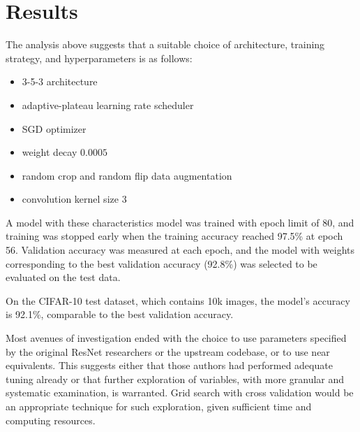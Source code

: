 \documentclass[letterpaper]{article} %
\begin{document}
\section{Results}

The analysis above suggests that a suitable choice of architecture, training strategy, and hyperparameters
is as follows:
\begin{itemize}
    \item 3-5-3 architecture
    \item adaptive-plateau learning rate scheduler
    \item SGD optimizer
    \item weight decay $ 0.0005 $
    \item random crop and random flip data augmentation
    \item convolution kernel size $ 3 $
\end{itemize}

A model with these characteristics model was trained with epoch limit of 80, and
training was stopped early when the training accuracy reached 97.5\% at epoch 56.
Validation accuracy was measured at each epoch, and the model with weights corresponding to the best
validation accuracy (92.8\%) was selected to be evaluated on the test data.

On the CIFAR-10 test dataset, which contains 10k images, the model's accuracy is 92.1\%,
comparable to the best validation accuracy.

Most avenues of investigation ended with the choice to use parameters specified by the original ResNet researchers or
the upstream codebase, or to use near equivalents.
This suggests either that those authors had performed adequate tuning already or that further exploration of variables,
with more granular and systematic examination, is warranted.
Grid search with cross validation would be an appropriate technique for such exploration, given sufficient time and
computing resources.


\end{document}
